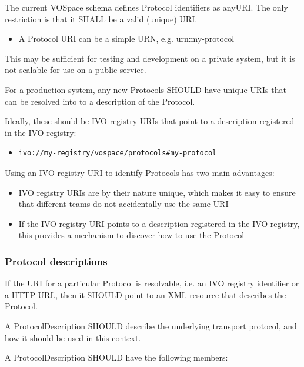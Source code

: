 \documentclass[11pt,a4paper]{ivoa}
\begin{document}
The current VOSpace schema defines Protocol identifiers as anyURI. The only restriction is that it SHALL be a valid (unique) URI.

\begin{itemize}
    \item A Protocol URI can be a simple URN, e.g. urn:my-protocol
\end{itemize}

This may be sufficient for testing and development on a private system, but it is not scalable for use on a public service.

For a production system, any new Protocols SHOULD have unique URIs that can be resolved into to a description of the Protocol.

Ideally, these should be IVO registry URIs that point to a description registered in the IVO registry:

\begin{itemize}
    \item \begin{verbatim}ivo://my-registry/vospace/protocols#my-protocol\end{verbatim}
\end{itemize}

Using an IVO registry URI to identify Protocols has two main advantages:

\begin{itemize}
    \item IVO registry URIs are by their nature unique, which makes it easy to ensure that different teams do not accidentally use the same URI
    \item If the IVO registry URI points to a description registered in the IVO registry, this provides a mechanism to discover how to use the Protocol
\end{itemize}

\subsubsection{Protocol descriptions}
\label{subsubsec:protocol descriptions}
If the URI for a particular Protocol is resolvable, i.e. an IVO registry identifier or a HTTP URL, then it SHOULD point to an XML resource that describes the Protocol.

A ProtocolDescription SHOULD describe the underlying transport protocol, and how it should be used in this context.

A ProtocolDescription SHOULD have the following members:
\end{document}
